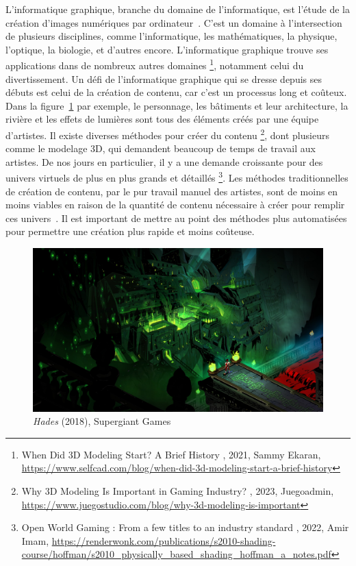 \Introduction
\label{ch:introduction}

L'informatique graphique, branche du domaine de l'informatique, est l'étude de la création d'images numériques par ordinateur~\cite{poinssac_infographie_1994}. C'est un domaine à l'intersection de plusieurs disciplines, comme l'informatique, les mathématiques, la physique, l'optique, la biologie, et d'autres encore. L'informatique graphique trouve ses applications dans de nombreux autres domaines \footnote{\og When Did 3D Modeling Start? A Brief History \fg, 2021, Sammy Ekaran, \url{https://www.selfcad.com/blog/when-did-3d-modeling-start-a-brief-history}}, notamment celui du divertissement. Un défi de l'informatique graphique qui se dresse depuis ses débuts est celui de la création de contenu, car c'est un processus long et coûteux. Dans la figure~\ref{fig:hades} par exemple, le personnage, les bâtiments et leur architecture, la rivière et les effets de lumières sont tous des éléments créés par une équipe d'artistes. Il existe diverses méthodes pour créer du contenu \footnote{\og Why 3D Modeling Is Important in Gaming Industry? \fg, 2023, Juegoadmin, \url{https://www.juegostudio.com/blog/why-3d-modeling-is-important}}, dont plusieurs comme le modelage 3D, qui demandent beaucoup de temps de travail aux artistes. De nos jours en particulier, il y a une demande croissante pour des univers virtuels de plus en plus grands et détaillés \footnote{\og Open World Gaming : From a few titles to an industry standard \fg, 2022, Amir Imam, \url{https://renderwonk.com/publications/s2010-shading-course/hoffman/s2010_physically_based_shading_hoffman_a_notes.pdf}}. Les méthodes traditionnelles de création de contenu, par le pur travail manuel des artistes, sont de moins en moins viables en raison de la quantité de contenu nécessaire à créer pour remplir ces univers~\cite{freiknecht_survey_2017}. Il est important de mettre au point des méthodes plus automatisées pour permettre une création plus rapide et moins coûteuse.

\bigskip

\begin{figure}[!h]
    \centering
    \includegraphics[width=.85\textwidth]{contenu/resources/images/hades}
    \caption[\textit{Hades} (2018), Supergiant Games]{\textit{Hades} (2018), Supergiant Games~\cite{supergiant_hades_2018}}
    \label{fig:hades}
\end{figure}

